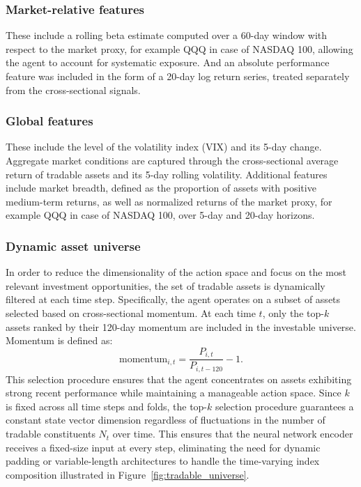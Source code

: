 \documentclass[]{elsarticle}
\begin{document}
\subsubsection{Market-relative features}

These include a rolling beta estimate computed over a 60-day window with respect to the market proxy, for example QQQ in case of NASDAQ 100, allowing the agent to account for systematic exposure. And an absolute performance feature was included in the form of a 20-day log return series, treated separately from the cross-sectional signals.

\subsubsection{Global features}

These include the level of the volatility index (VIX) and its 5-day change. Aggregate market conditions are captured through the cross-sectional average return of tradable assets and its 5-day rolling volatility. Additional features include market breadth, defined as the proportion of assets with positive medium-term returns, as well as normalized returns of the market proxy, for example QQQ in case of NASDAQ 100, over 5-day and 20-day horizons.

\subsubsection{Dynamic asset universe}
In order to reduce the dimensionality of the action space and focus on the most relevant investment opportunities, the set of tradable assets is dynamically filtered at each time step. Specifically, the agent operates on a subset of assets selected based on cross-sectional momentum. At each time \(t\), only the top-\(k\) assets ranked by their 120-day momentum are included in the investable universe. Momentum is defined as:
\begin{equation}
\text{momentum}_{i,t} = \frac{P_{i,t}}{P_{i,t-120}} - 1.
\end{equation}
This selection procedure ensures that the agent concentrates on assets exhibiting strong recent performance while maintaining a manageable action space. Since $k$ is fixed across all time steps and folds, the top-$k$ selection procedure guarantees a constant state vector dimension regardless of fluctuations in the number of tradable constituents $N_t$ over time. This ensures that the neural network encoder receives a fixed-size input at every step, eliminating the need for dynamic padding or variable-length architectures to handle the time-varying index composition illustrated in Figure~\ref{fig:tradable_universe}.
\end{document}
